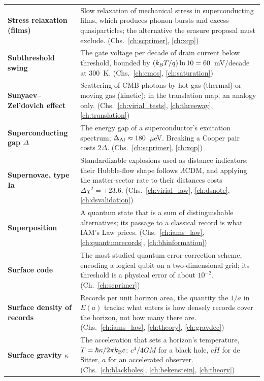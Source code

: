 {\begin{longtable}{@{}>{\raggedright\arraybackslash}p{}>{\raggedright\arraybackslash}p{}@{}}
\textbf{Stress relaxation (films)} & Slow relaxation of mechanical stress in superconducting films, which produces phonon bursts and excess quasiparticles; the alternative the erasure proposal must exclude. {\footnotesize(Chs.~\ref{ch:scprimer}, \ref{ch:xqp})}\\[1pt]
\textbf{Subthreshold swing} & The gate voltage per decade of drain current below threshold, bounded by $(k_{\mathrm B} T/q)\ln10=60$~mV/decade at 300~K. {\footnotesize(Chs.~\ref{ch:cmos}, \ref{ch:saturation})}\\[1pt]
\textbf{Sunyaev--Zel'dovich effect} & Scattering of CMB photons by hot gas (thermal) or moving gas (kinetic); in the translation map, an analogy only. {\footnotesize(Chs.~\ref{ch:virial_tests}, \ref{ch:threeway}, \ref{ch:translation})}\\[1pt]
\textbf{Superconducting gap $\Delta$} & The energy gap of a superconductor's excitation spectrum; $\Delta_{\rm Al}\approx180$~$\mu$eV. Breaking a Cooper pair costs $2\Delta$. {\footnotesize(Chs.~\ref{ch:scprimer}, \ref{ch:xqp})}\\[1pt]
\textbf{Supernovae, type Ia} & Standardizable explosions used as distance indicators; their Hubble-flow shape follows $\Lambda$CDM, and applying the matter-sector rate to their distances costs $\Delta\chi^2=+23.6$. {\footnotesize(Chs.~\ref{ch:virial_law}, \ref{ch:dsnote}, \ref{ch:dsvalidation})}\\[1pt]
\textbf{Superposition} & A quantum state that is a sum of distinguishable alternatives; its passage to a classical record is what IAM's Law prices. {\footnotesize(Chs.~\ref{ch:iams_law}, \ref{ch:quantumrecords}, \ref{ch:bhinformation})}\\[1pt]
\textbf{Surface code} & The most studied quantum error-correction scheme, encoding a logical qubit on a two-dimensional grid; its threshold is a physical error of about $10^{-2}$. {\footnotesize(Ch.~\ref{ch:scprimer})}\\[1pt]
\textbf{Surface density of records} & Records per unit horizon area, the quantity the $1/a$ in $E(a)$ tracks: what enters is how densely records cover the horizon, not how many there are. {\footnotesize(Chs.~\ref{ch:iams_law}, \ref{ch:theory}, \ref{ch:gravdec})}\\[1pt]
\textbf{Surface gravity $\kappa$} & The acceleration that sets a horizon's temperature, $T=\hbar\kappa/2\pi k_{\mathrm B} c$: $c^4/4GM$ for a black hole, $cH$ for de Sitter, $a$ for an accelerated observer. {\footnotesize(Chs.~\ref{ch:blackholes}, \ref{ch:bekenstein}, \ref{ch:theory})}\\[1pt]

\end{longtable}}
